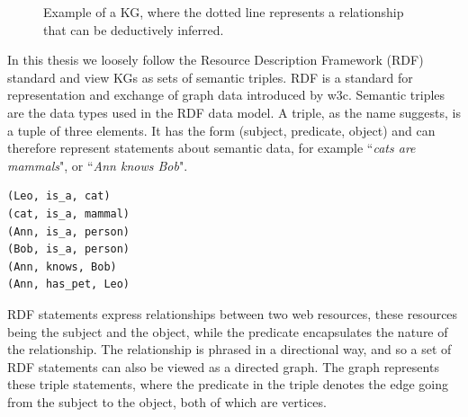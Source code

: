 \begin{figure}[htbp]
\centering
{}

\caption[Simple visual example of a KG.]{Example of a KG, where the dotted line represents a relationship that can be deductively inferred.} \label{fig:KGexample}
\end{figure}

In this thesis we loosely follow the Resource Description Framework (RDF) standard and view KGs as sets of semantic triples. RDF is a standard for representation and exchange of graph data introduced by \gls{w3c}. Semantic triples are the data types used in the RDF data model. A triple, as the name suggests, is a tuple of three elements. It has the form (subject, predicate, object) and can therefore represent statements about semantic data, for example ``\textit{cats are mammals}", or ``\textit{Ann knows Bob}". 
\begin{lstlisting}[caption={Example of RDF triple set written in informal pseudocode.}, label={RDF_triples_example}]
(Leo, is_a, cat)
(cat, is_a, mammal)
(Ann, is_a, person)
(Bob, is_a, person)
(Ann, knows, Bob)
(Ann, has_pet, Leo)
\end{lstlisting}
RDF statements express relationships between two web resources, these resources being the subject and the object, while the predicate encapsulates the nature of the relationship. The relationship is phrased in a directional way, and so a set of RDF statements can also be viewed as a directed graph. The graph represents these triple statements, where the predicate in the triple denotes the edge going from the subject to the object, both of which are vertices.

